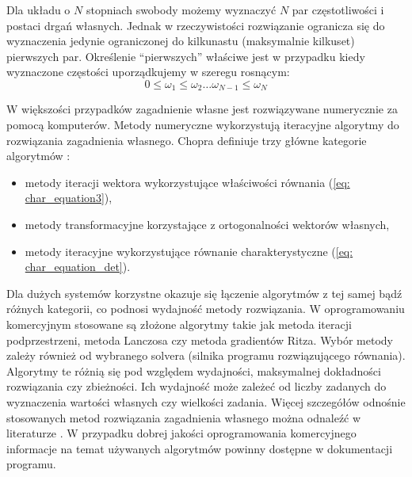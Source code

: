 Dla układu o $N$ stopniach swobody możemy wyznaczyć $N$ par częstotliwości i postaci drgań własnych. Jednak w rzeczywistości rozwiązanie ogranicza się do wyznaczenia jedynie ograniczonej do kilkunastu (maksymalnie kilkuset) pierwszych par. Określenie \enquote{pierwszych} właściwe jest w przypadku kiedy wyznaczone częstości uporządkujemy w szeregu rosnącym:
\begin{equation} \label{eq: eigenvalues_list}
0 \leq \omega_1  \leq \omega_2 \dots  \omega_{N-1} \leq  \omega_N
\end{equation}

W większości przypadków zagadnienie własne jest rozwiązywane numerycznie za pomocą komputerów. Metody numeryczne wykorzystują iteracyjne algorytmy do rozwiązania zagadnienia własnego. Chopra  definiuje trzy główne kategorie algorytmów \cite{Chopra2012a}: 
\begin{itemize}
	\item metody iteracji wektora wykorzystujące właściwości równania (\ref{eq: char_equation3}),
	\item metody transformacyjne korzystające z ortogonalności wektorów własnych,
	\item metody iteracyjne wykorzystujące równanie charakterystyczne (\ref{eq: char_equation_det}).
\end{itemize}
Dla dużych systemów korzystne okazuje się łączenie algorytmów z tej samej bądź różnych kategorii, co podnosi wydajność metody rozwiązania. W oprogramowaniu komercyjnym stosowane są złożone algorytmy takie jak metoda iteracji podprzestrzeni, metoda Lanczosa czy metoda gradientów Ritza. Wybór metody zależy również od wybranego solvera (silnika programu rozwiązującego równania). Algorytmy te różnią się pod względem wydajności, maksymalnej dokładności rozwiązania czy zbieżności. Ich wydajność może zależeć od liczby zadanych do wyznaczenia wartości własnych czy wielkości zadania. Więcej szczegółów odnośnie stosowanych metod rozwiązania zagadnienia własnego można odnaleźć w literaturze \parencite{Bathe2006,Wilson1983,Wilson1997,Fialko2000,Papadrakakis1993,Hughes1987,Chopra2012a}. W przypadku dobrej jakości oprogramowania komercyjnego informacje na temat używanych algorytmów powinny dostępne w dokumentacji programu.

